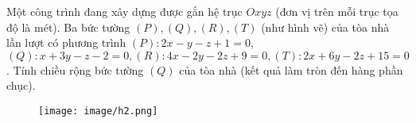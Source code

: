 \begin{ex}%
	Một công trình đang xây dựng được gắn hệ trục $O x y z$ (đơn vị trên mỗi trục tọa độ là mét). Ba bức tường $(P),(Q),(R),(T)$ (như hình vẽ) của tòa nhà lần lượt có phương trình $(P)\colon 2x-y-z+1=0$, $(Q)\colon x+3y-z-2=0,(R)\colon 4x-2y-2 z+9=0,(T)\colon 2x+6y-2z+15=0$. Tính chiều rộng bức tường $(Q)$ của tòa nhà (kết quả làm tròn đến hàng phần chục).
	\begin{figure}[!ht]
		\centering
		\texttt{[image: image/h2.png]}
	\end{figure}
\end{ex}
